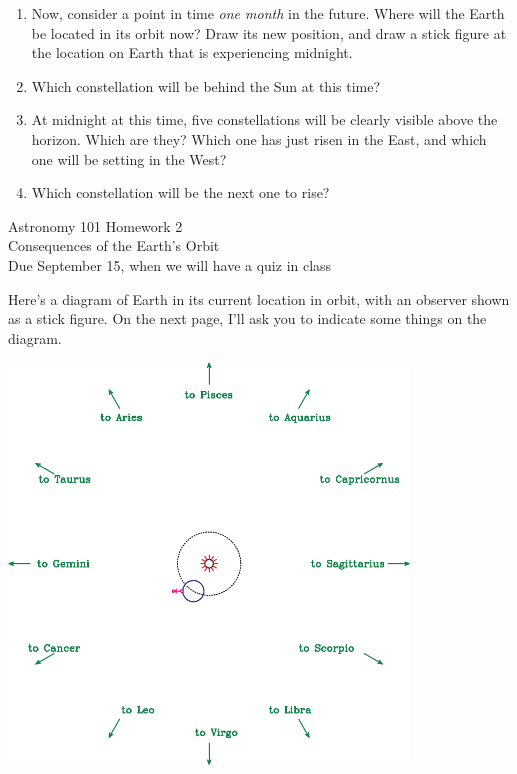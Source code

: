 \documentclass[12pt]{article}
\begin{document}
\begin{enumerate}
\vspace{1in}

\item Now, consider a point in time {\it one month} in the future. Where will the Earth be located in its orbit now? Draw its new position, and draw a stick figure at the location on Earth that is experiencing midnight. 

\vspace{1in}

\item Which constellation will be behind the Sun at this time?

\vspace{1in}

\item At midnight at this time, five constellations will be clearly visible above the horizon. Which are they? Which one has just risen in the East, and which one will be setting in the West? 

\vspace{1in}

\item Which constellation will be the next one to rise?


\newpage


\end{enumerate}



\begin{center}
	\sc \Large Astronomy 101 Homework 2 \\ \large Consequences of the Earth's Orbit\\
	\normalsize \rm Due September 15, when we will have a quiz in class
\end{center}

Here's a diagram of Earth in its current location in orbit, with an observer shown as a stick figure. On the next page, I'll ask you to indicate some things on the diagram.
\begin{center}
\includegraphics [width=0.8\textwidth]{hw-diagram-crop.pdf}
\end{center}
\end{document}
